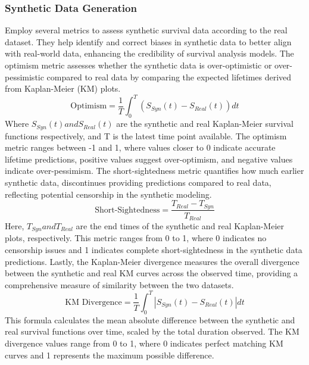 \subsubsection*{Synthetic Data Generation}
\noindent \parencite{norcliffe_survivalgan_2023} Employ several metrics to assess synthetic survival data according to the real dataset. They help identify and correct biases in synthetic data to better align with real-world data, enhancing the credibility of survival analysis models. The optimism metric assesses whether the synthetic data is over-optimistic or over-pessimistic compared to real data by comparing the expected lifetimes derived from Kaplan-Meier (KM) plots.
\begin{equation} \label{eq:optimisim}\text{Optimism} = \frac{1}{T} \int_{0}^{T}(S_{Syn}(t)-S_{Real}(t))dt\end{equation}
\noindent Where \(S_{Syn}(t) and S_{Real}(t)\) are the synthetic and real Kaplan-Meier survival functions respectively, and T is the latest time point available. The optimism metric ranges between -1 and 1, where values closer to 0 indicate accurate lifetime predictions, positive values suggest over-optimism, and negative values indicate over-pessimism. The short-sightedness metric quantifies how much earlier synthetic data, discontinues providing predictions compared to real data, reflecting potential censorship in the synthetic modeling.
\begin{equation} \label{eq:ssmetric}\text{Short-Sightedness} = \frac{T_{Real}-T_{Syn}}{T_{Real}}\end{equation}
\noindent Here, \(T_{Syn} and T_{Real}\) are the end times of the synthetic and real Kaplan-Meier plots, respectively. This metric ranges from 0 to 1, where 0 indicates no censorship issues and 1 indicates complete short-sightedness in the synthetic data predictions. Lastly, the Kaplan-Meier divergence measures the overall divergence between the synthetic and real KM curves across the observed time, providing a comprehensive measure of similarity between the two datasets.
\begin{equation} \label{eq:kmdiverge}\text{KM Divergence} = \frac{1}{T}\int_{0}^{T}|S_{Syn}(t)-S_{Real}(t)|dt\end{equation}
\noindent This formula calculates the mean absolute difference between the synthetic and real survival functions over time, scaled by the total duration observed. The KM divergence values range from 0 to 1, where 0 indicates perfect matching KM curves and 1 represents the maximum possible difference.

